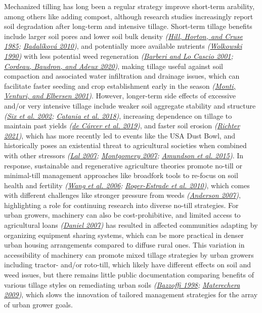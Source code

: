 \documentclass[
  12pt,
]{article}
\begin{document}
Mechanized tilling has long been a regular strategy improve short-term arability, among others like adding compost, although research studies increasingly report soil degradation after long-term and intensive tillage.
Short-term tillage benefits include larger soil pores and lower soil bulk density \emph{(\protect\hyperlink{ref-hill85}{Hill, Horton, and Cruse 1985}; \protect\hyperlink{ref-badalikova10}{Badalíková 2010})}, and potentially more available nutrients \emph{(\protect\hyperlink{ref-wolkowski90}{Wolkowski 1990})} with less potential weed regeneration \emph{(\protect\hyperlink{ref-barberi01}{Barberi and Lo Cascio 2001}; \protect\hyperlink{ref-cordeau20}{Cordeau, Baudron, and Adeux 2020})}, making tillage useful against soil compaction and associated water infiltration and drainage issues, which can facilitate faster seeding and crop establishment early in the season \emph{(\protect\hyperlink{ref-monti01}{Monti, Venturi, and Elbersen 2001})}.
However, longer-term side effects of excessive and/or very intensive tillage include weaker soil aggregate stability and structure \emph{(\protect\hyperlink{ref-six02a}{Six et al. 2002}; \protect\hyperlink{ref-catania18}{Catania et al. 2018})}, increasing dependence on tillage to maintain past yields \emph{(\protect\hyperlink{ref-decarcer19}{de Cárcer et al. 2019})}, and faster soil erosion \emph{(\protect\hyperlink{ref-richter21}{Richter 2021})}, which has more recently led to events like the USA Dust Bowl, and historically poses an existential threat to agricultural societies when combined with other stressors \emph{(\protect\hyperlink{ref-lal07}{Lal 2007}; \protect\hyperlink{ref-montgomery07}{Montgomery 2007}; \protect\hyperlink{ref-amundson15}{Amundson et al. 2015})}.
In response, sustainable and regenerative agriculture theories promote no-till or minimal-till management approaches like broadfork tools to re-focus on soil health and fertility \emph{(\protect\hyperlink{ref-wang06}{Wang et al. 2006}; \protect\hyperlink{ref-roger-estrade10}{Roger-Estrade et al. 2010})}, which comes with different challenges like stronger pressure from weeds \emph{(\protect\hyperlink{ref-anderson07}{Anderson 2007})}, highlighting a role for continuing research into diverse no-till strategies.
For urban growers, machinery can also be cost-prohibitive, and limited access to agricultural loans \emph{(\protect\hyperlink{ref-daniel07}{Daniel 2007})} has resulted in affected communities adapting by organizing equipment sharing systems, which can be more practical in denser urban housing arrangements compared to diffuse rural ones.
This variation in accessibility of machinery can promote mixed tillage strategies by urban growers including tractor- and/or roto-till, which likely have different effects on soil and weed issues, but there remains little public documentation comparing benefits of various tillage styles on remediating urban soils \emph{(\protect\hyperlink{ref-bazzoffi98}{Bazzoffi 1998}; \protect\hyperlink{ref-materechera09}{Materechera 2009})}, which slows the innovation of tailored management strategies for the array of urban grower goals.
\end{document}
